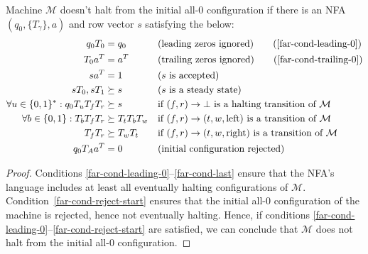 \begin{theorem}
    \label{far-main-theorem}
    Machine $\mathcal{M}$ doesn't halt from the initial all-0 configuration if there is an NFA $(q_0, \{T_\gamma\}, a)$ and row vector $s$ satisfying the below:
    \begin{align}
        \label{far-cond-first}
        q_0 T_0                                & = q_0
                                               &                     & \text{(leading zeros ignored)}
        \tag{\ref{far-cond-leading-0}}
        \\
        T_0a\T                                 & = a\T
                                               &                     & \text{(trailing zeros ignored)}
        \tag{\ref{far-cond-trailing-0}}
        \\
        sa\T                                   & = 1
                                               &                     & \text{($s$ is accepted)}
        \label{far-cond-ass-accepted}
        \\
        sT_0,sT_1                              & \succeq s
                                               &                     & \text{($s$ is a steady state)}
        \label{far-cond-ass-steady}
        \\
        \forall u\in\{0, 1\}^*: q_0T_u T_f T_r & \succeq s
                                               &                     & \text{if $(f,r) \to \bot$ is a halting transition of $\mathcal{M}$}
        \label{far-cond-halt}
        \\
        \forall b\in\{0, 1\}: T_b T_f T_r      & \succeq T_t T_b T_w
                                               &                     & \text{if $(f,r) \to (t,w,\text{left})$ is a transition of $\mathcal{M}$}
        \label{far-cond-left}
        \\
        T_f T_r                                & \succeq T_w T_t
                                               &                     & \text{if $(f,r) \to (t,w,\text{right})$ is a transition of $\mathcal{M}$}
        \label{far-cond-last}
        \\
        q_0 T_A a\T                            & = 0
                                               &                     & \text{(initial configuration rejected)}
        \label{far-cond-reject-start}
    \end{align}
\end{theorem}
\begin{proof}
    Conditions \eqref{far-cond-leading-0}--\eqref{far-cond-last} ensure that the NFA's language includes at least all eventually halting configurations of $\mathcal{M}$. Condition~\eqref{far-cond-reject-start} ensures that the initial all-0 configuration of the machine is rejected, hence not eventually halting. Hence, if conditions \eqref{far-cond-leading-0}--\eqref{far-cond-reject-start} are satisfied, we can conclude that $\mathcal{M}$ does not halt from the initial all-0 configuration.
\end{proof}


